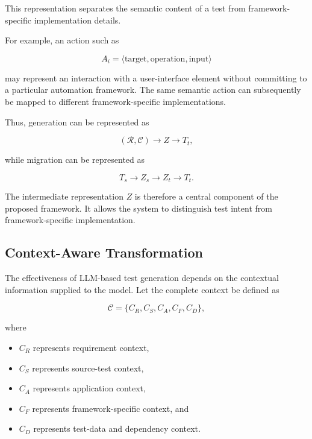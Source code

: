 \documentclass[pdflatex,sn-mathphys-num]{sn-jnl}
\begin{document}
This representation separates the semantic content of a test from
framework-specific implementation details.

For example, an action such as

\begin{equation}
    A_i =
    \langle
    \text{target},\text{operation},\text{input}
    \rangle
\end{equation}

may represent an interaction with a user-interface element without
committing to a particular automation framework. The same semantic action
can subsequently be mapped to different framework-specific implementations.

Thus, generation can be represented as

\begin{equation}
    (\mathcal{R},\mathcal{C})
    \rightarrow
    Z
    \rightarrow
    T_t ,
\label{eq:generation-pipeline}
\end{equation}

while migration can be represented as

\begin{equation}
    T_s
    \rightarrow
    Z_s
    \rightarrow
    Z_t
    \rightarrow
    T_t .
\label{eq:migration-pipeline}
\end{equation}

The intermediate representation $Z$ is therefore a central component of the
proposed framework. It allows the system to distinguish test intent from
framework-specific implementation.

\subsection{Context-Aware Transformation}

The effectiveness of LLM-based test generation depends on the contextual
information supplied to the model. Let the complete context be defined as

\begin{equation}
    \mathcal{C}
    =
    \{
    C_R,
    C_S,
    C_A,
    C_F,
    C_D
    \},
\label{eq:context}
\end{equation}

where

\begin{itemize}
    \item $C_R$ represents requirement context,
    \item $C_S$ represents source-test context,
    \item $C_A$ represents application context,
    \item $C_F$ represents framework-specific context, and
    \item $C_D$ represents test-data and dependency context.
\end{itemize}
\end{document}
